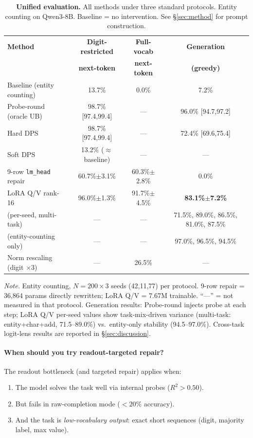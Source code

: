\documentclass{article}
\begin{document}
\begin{table}[h]
\caption{\textbf{Unified evaluation.} All methods under three standard protocols. Entity counting on Qwen3-8B. Baseline = no intervention. See \S\ref{sec:method} for prompt construction.}
\label{tab:unified_evaluation}
\begin{tabular}{lccc}
\toprule
\textbf{Method} & \textbf{Digit-restricted} & \textbf{Full-vocab} & \textbf{Generation} \\
 & \textbf{next-token} & \textbf{next-token} & \textbf{(greedy)} \\
\midrule
Baseline (entity counting) & 13.7\% & 0.0\% & 7.2\% \\
Probe-round (oracle UB) &  98.7\% [97.4,99.4] & --- & 96.0\% [94.7,97.2] \\
\quad Hard DPS & 98.7\% [97.4,99.4] & --- & 72.4\% [69.6,75.4] \\
\quad Soft DPS & 13.2\% ($\approx$baseline) & --- & --- \\
9-row \texttt{lm\_head} repair & 60.7\%$\pm$3.1\% & 60.3\%$\pm$2.8\% & 0.0\% \\
LoRA Q/V rank-16 & 96.0\%$\pm$1.3\% & 91.7\%$\pm$4.5\% & \textbf{83.1\%$\pm$7.2\%} \\
\quad (per-seed, multi-task) & --- & --- & 71.5\%, 89.0\%, 86.5\%, 81.0\%, 87.5\% \\
\quad (entity-counting only) & --- & --- & 97.0\%, 96.5\%, 94.5\% \\
Norm rescaling (digit $\times$3) & --- & 26.5\% & --- \\
\bottomrule
\end{tabular}
\vspace{4pt}
\par\scriptsize
\textit{Note.} Entity counting, $N{=}200{\times}3$ seeds (42,11,77) per protocol. 9-row repair = 36,864 params directly rewritten; LoRA Q/V = 7.67M trainable. ``---'' = not measured in that protocol. Generation results: Probe-round injects probe at each step; LoRA Q/V per-seed values show task-mix-driven variance (multi-task: entity+char+add, 71.5--89.0\%) vs.\ entity-only stability (94.5--97.0\%). Cross-task logit-lens results are reported in \S\ref{sec:discussion}.
\end{table}

\paragraph{When should you try readout-targeted repair?}
The readout bottleneck (and targeted repair) applies when:
\begin{enumerate}
  \item The model solves the task well via internal probes ($R^2 > 0.50$).
  \item But fails in raw-completion mode ($< 20\%$ accuracy).
  \item And the task is \emph{low-vocabulary output}: exact short sequences (digit, majority label, max value).
\end{enumerate}
\end{document}

